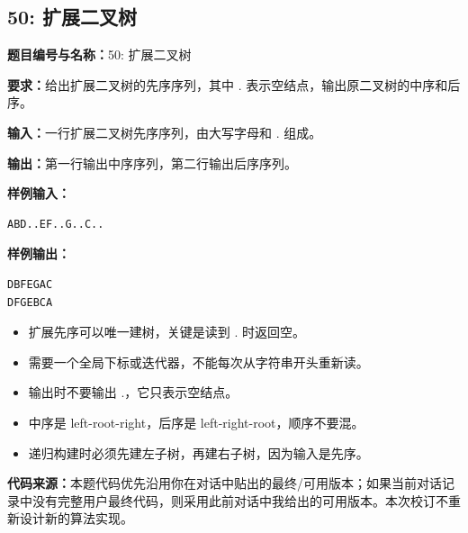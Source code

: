 \documentclass[10pt,a4paper,fontset=none]{ctexart}
\newcommand{\codesource}{\par\noindent\textbf{代码来源：}本题代码优先沿用你在对话中贴出的最终/可用版本；如果当前对话记录中没有完整用户最终代码，则采用此前对话中我给出的可用版本。本次校订不重新设计新的算法实现。\par\vspace{0.2em}}
\begin{document}
\subsection{50: 扩展二叉树}
\begin{taskbox}
\textbf{题目编号与名称：}50: 扩展二叉树\par
\textbf{要求：}给出扩展二叉树的先序序列，其中 . 表示空结点，输出原二叉树的中序和后序。\par
\textbf{输入：}一行扩展二叉树先序序列，由大写字母和 . 组成。\par
\textbf{输出：}第一行输出中序序列，第二行输出后序序列。\par
\textbf{样例输入：}
\begin{lstlisting}[style=sample]
ABD..EF..G..C..
\end{lstlisting}
\textbf{样例输出：}
\begin{lstlisting}[style=sample]
DBFEGAC
DFGEBCA
\end{lstlisting}
\end{taskbox}
\begin{mistakebox}
\begin{itemize}
  \item 扩展先序可以唯一建树，关键是读到 . 时返回空。
  \item 需要一个全局下标或迭代器，不能每次从字符串开头重新读。
  \item 输出时不要输出 .，它只表示空结点。
  \item 中序是 left-root-right，后序是 left-right-root，顺序不要混。
  \item 递归构建时必须先建左子树，再建右子树，因为输入是先序。
\end{itemize}
\end{mistakebox}
\codesource
\end{document}
